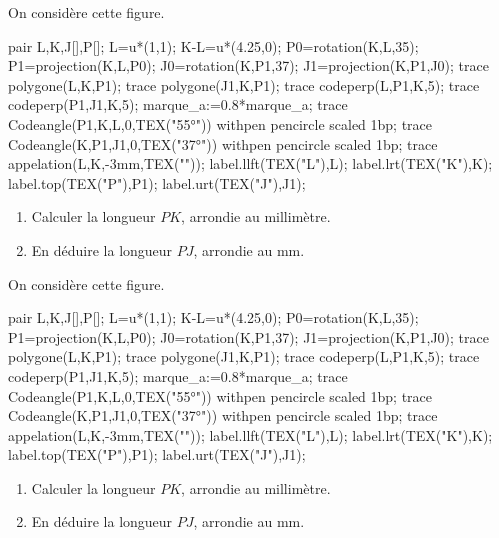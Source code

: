 \begin{exercice*}
    On considère cette figure.
    \begin{center}
        \begin{Geometrie}
            pair L,K,J[],P[];
            L=u*(1,1);
            K-L=u*(4.25,0);
            P0=rotation(K,L,35);
            P1=projection(K,L,P0);
            J0=rotation(K,P1,37);
            J1=projection(K,P1,J0);
            trace polygone(L,K,P1);
            trace polygone(J1,K,P1);
            trace codeperp(L,P1,K,5);
            trace codeperp(P1,J1,K,5);
            marque_a:=0.8*marque_a;
            trace Codeangle(P1,K,L,0,TEX("\ang{55}")) withpen pencircle scaled 1bp;
            trace Codeangle(K,P1,J1,0,TEX("\ang{37}")) withpen pencircle scaled 1bp;
            trace appelation(L,K,-3mm,TEX(""));
            label.llft(TEX("L"),L);
            label.lrt(TEX("K"),K);
            label.top(TEX("P"),P1);
            label.urt(TEX("J"),J1);
        \end{Geometrie}
    \end{center}
    \begin{enumerate}
        \item Calculer la longueur $PK$, arrondie au millimètre.
        \item En déduire la longueur $PJ$, arrondie au mm.
    \end{enumerate}
\end{exercice*}
\begin{corrige}
    On considère cette figure.
    \begin{Geometrie}
        pair L,K,J[],P[];
        L=u*(1,1);
        K-L=u*(4.25,0);
        P0=rotation(K,L,35);
        P1=projection(K,L,P0);
        J0=rotation(K,P1,37);
        J1=projection(K,P1,J0);
        trace polygone(L,K,P1);
        trace polygone(J1,K,P1);
        trace codeperp(L,P1,K,5);
        trace codeperp(P1,J1,K,5);
        marque_a:=0.8*marque_a;
        trace Codeangle(P1,K,L,0,TEX("\ang{55}")) withpen pencircle scaled 1bp;
        trace Codeangle(K,P1,J1,0,TEX("\ang{37}")) withpen pencircle scaled 1bp;
        trace appelation(L,K,-3mm,TEX(""));
        label.llft(TEX("L"),L);
        label.lrt(TEX("K"),K);
        label.top(TEX("P"),P1);
        label.urt(TEX("J"),J1);
    \end{Geometrie}

    \begin{enumerate}
        \item Calculer la longueur $PK$, arrondie au millimètre.
        
        {\color{red}}
        \item En déduire la longueur $PJ$, arrondie au mm.
        
        {\color{red}}
    \end{enumerate}
\end{corrige}

